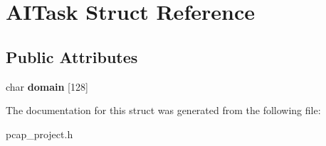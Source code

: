 \hypertarget{structAITask}{}\section{A\+I\+Task Struct Reference}
\label{structAITask}
\subsection*{Public Attributes}
\begin{DoxyCompactItemize}
\item 
\mbox{\label{structAITask_ad2e94407e0119912fcd870159166a3d8}} 
char {\bfseries domain} \mbox{[}128\mbox{]}
\end{DoxyCompactItemize}


The documentation for this struct was generated from the following file\+:\begin{DoxyCompactItemize}
\item 
pcap\+\_\+project.\+h\end{DoxyCompactItemize}

